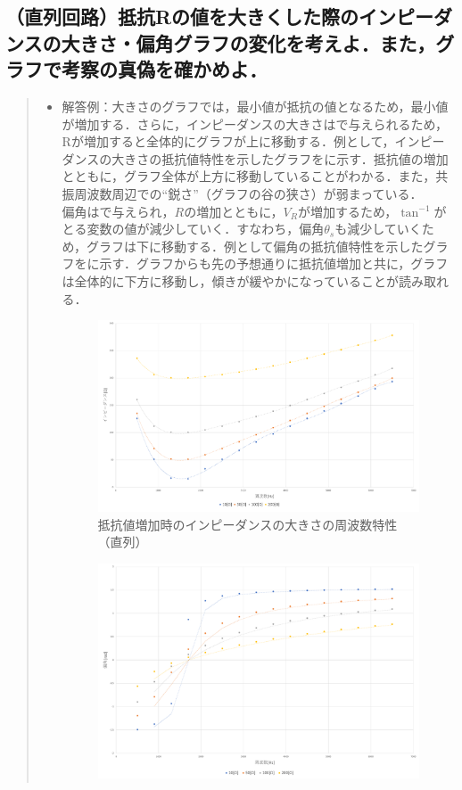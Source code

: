 \documentclass[11pt,dvipdfmx]{jarticle}
\begin{document}
\subsection{（直列回路）抵抗Rの値を大きくした際のインピーダンスの大きさ・偏角グラフの変化を考えよ．また，グラフで考察の真偽を確かめよ．}
\begin{quote}
\begin{itemize}
\item 解答例：大きさのグラフでは，最小値が抵抗の値となるため，最小値が増加する．さらに，インピーダンスの大きさはで与えられるため，Rが増加すると全体的にグラフが上に移動する．例として，インピーダンスの大きさの抵抗値特性を示したグラフをに示す．抵抗値の増加とともに，グラフ全体が上方に移動していることがわかる．また，共振周波数周辺での``鋭さ''（グラフの谷の狭さ）が弱まっている．\\
偏角はで与えられ，$R$の増加とともに，$V_{R}$が増加するため，$\tan^{-1}$がとる変数の値が減少していく．すなわち，偏角$\theta_{s}$も減少していくため，グラフは下に移動する．例として偏角の抵抗値特性を示したグラフをに示す．グラフからも先の予想通りに抵抗値増加と共に，グラフは全体的に下方に移動し，傾きが緩やかになっていることが読み取れる．
\begin{figure}
 \centering
 \includegraphics[scale=0.45]{./fig/graph5.pdf}
 \caption{抵抗値増加時のインピーダンスの大きさの周波数特性（直列）}
 \label{fig:fig11}
\end{figure}
\begin{figure}[hbpt]
 \centering
 \includegraphics[scale=0.45]{./fig/graph6.pdf}

\end{figure}
\end{itemize}
\end{quote}
\end{document}

